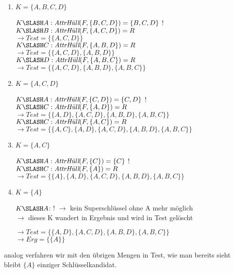 \documentclass{lehramt-informatik-haupt}
\begin{document}
\begin{enumerate}


\item $K = \{A, B, C, D\}$

$K \SLASH A: \textit{AttrHüll}(F, \{B, C, D\}) = \{B, C, D\}$ !\\

$K \SLASH B: \textit{AttrHüll}(F, \{A, C, D\}) = R$\\
$\rightarrow Test = \{\{A, C, D\}\}$ \\

$K \SLASH C: \textit{AttrHüll}(F, \{A, B, D\}) = R$\\
$\rightarrow Test = \{\{A, C, D\}, \{A, B, D\}\}$ \\

$K \SLASH D: \textit{AttrHüll}(F, \{A, B, C\}) = R$\\
$\rightarrow Test = \{\{A, C, D\}, \{A, B, D\}, \{A, B, C\}\}$ \\


\item $K = \{A, C, D\}$

$K \SLASH A: \textit{AttrHüll}(F, \{C, D\}) = \{C, D\}$ !\\

$K \SLASH C: \textit{AttrHüll}(F, \{A, D\}) = R$\\
$\rightarrow Test = \{\{A, D\}, \{A, C, D\}, \{A, B, D\}, \{A, B, C\}\}$ \\

$K \SLASH C: \textit{AttrHüll}(F, \{A, C\}) = R$\\
$\rightarrow Test = \{\{A, C\}, \{A, D\}, \{A, C, D\}, \{A, B, D\}, \{A, B, C\}\}$ \\


\item $K = \{A, C\}$

$K \SLASH A: \textit{AttrHüll}(F, \{C\}) = \{C\}$ !\\

$K \SLASH C: \textit{AttrHüll}(F, \{A\}) = R$\\
$\rightarrow Test = \{\{A\}, \{A, D\}, \{A, C, D\}, \{A, B, D\}, \{A, B, C\}\}$ \\


\item $K = \{A\}$

$K \SLASH A$: ! $\rightarrow$ kein Superschlüssel ohne A mehr möglich\\
$\rightarrow$ dieses K wandert in Ergebnis und wird in Test gelöscht

$\rightarrow Test = \{\{A, D\}, \{A, C, D\}, \{A, B, D\}, \{A, B, C\}\}$ \\
$\rightarrow Erg = \{\{A\}\}$ \\
\end{enumerate}

analog verfahren wir mit den übrigen Mengen in Test, wie man bereits
sieht bleibt $\{A\}$ einziger Schlüsselkandidat.

\literatur
\end{document}

